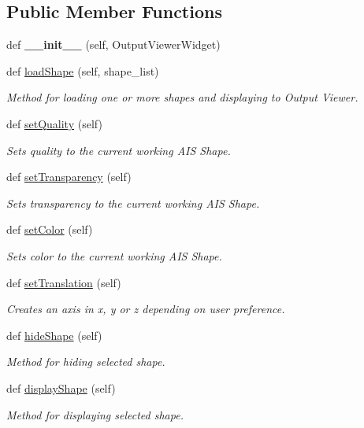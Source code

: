 \subsection*{Public Member Functions}
\begin{DoxyCompactItemize}
\item 
\hypertarget{a00095_aeafd1ea7cbe63a409e51e546db403bfd}{}\label{a00095_aeafd1ea7cbe63a409e51e546db403bfd} 
def {\bfseries \+\_\+\+\_\+init\+\_\+\+\_\+} (self, Output\+Viewer\+Widget)
\item 
def \hyperlink{a00095_a8833b4dba535cb76318777c031cf08b5}{load\+Shape} (self, shape\+\_\+list)
\begin{DoxyCompactList}\small\item\em Method for loading one or more shapes and displaying to Output Viewer. \end{DoxyCompactList}\item 
def \hyperlink{a00095_abe8c1dbcfe98b9f86a0560dd1e8b853a}{set\+Quality} (self)
\begin{DoxyCompactList}\small\item\em Sets quality to the current working A\+IS Shape. \end{DoxyCompactList}\item 
def \hyperlink{a00095_a8d7fdd0bde28afe34d3793c8bcf060fa}{set\+Transparency} (self)
\begin{DoxyCompactList}\small\item\em Sets transparency to the current working A\+IS Shape. \end{DoxyCompactList}\item 
def \hyperlink{a00095_ac659823f3085963daf751a6a94b366a7}{set\+Color} (self)
\begin{DoxyCompactList}\small\item\em Sets color to the current working A\+IS Shape. \end{DoxyCompactList}\item 
def \hyperlink{a00095_a1cab1ea26a1cd0091d88106b6b4715bb}{set\+Translation} (self)
\begin{DoxyCompactList}\small\item\em Creates an axis in x, y or z depending on user preference. \end{DoxyCompactList}\item 
def \hyperlink{a00095_ad4293087adb512ea61fe0c3429c0e08c}{hide\+Shape} (self)
\begin{DoxyCompactList}\small\item\em Method for hiding selected shape. \end{DoxyCompactList}\item 
def \hyperlink{a00095_aba26c11e7e7ec6c2c6709a27cbeaaf69}{display\+Shape} (self)
\begin{DoxyCompactList}\small\item\em Method for displaying selected shape. \end{DoxyCompactList}\end{DoxyCompactItemize}
